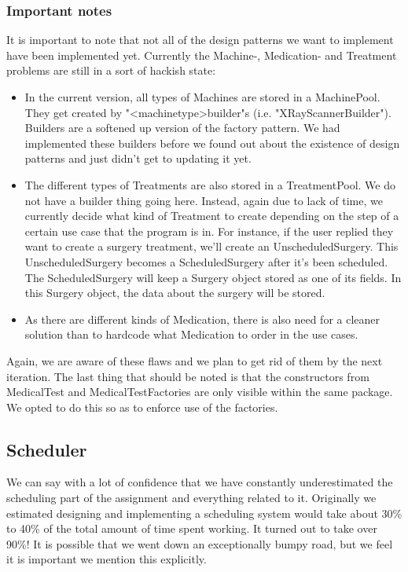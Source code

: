 \documentclass[11pt]{article}
\begin{document}
\subsubsection{Important notes}
It is important to note that not all of the design patterns we want to implement have been implemented yet. Currently the Machine-, Medication- and Treatment problems are still in a sort of hackish state:
\begin{itemize}
\item{In the current version, all types of Machines are stored in a MachinePool. They get created by "\textless machinetype\textgreater builder"s (i.e. "XRayScannerBuilder"). Builders are a softened up version of the factory pattern. We had implemented these builders before we found out about the existence of design patterns and just didn't get to updating it yet.}
\item{The different types of Treatments are also stored in a TreatmentPool. We do not have a builder thing going here. Instead, again due to lack of time, we currently decide what kind of Treatment to create depending on the step of a certain use case that the program is in. For instance, if the user replied they want to create a surgery treatment, we'll create an UnscheduledSurgery. This UnscheduledSurgery becomes a ScheduledSurgery after it's been scheduled. The ScheduledSurgery will keep a Surgery object stored as one of its fields. In this Surgery object, the data about the surgery will be stored.}
\item{As there are different kinds of Medication, there is also need for a cleaner solution than to hardcode what Medication to order in the use cases.}
\end{itemize}
Again, we are aware of these flaws and we plan to get rid of them by the next iteration.
\newline 
The last thing that should be noted is that the constructors from MedicalTest and MedicalTestFactories are only visible within the same package. We opted to do this so as to enforce use of the factories.

\subsection{Scheduler}
We can say with a lot of confidence that we have constantly underestimated the scheduling part of the assignment and everything related to it. Originally we estimated designing and implementing a scheduling system would take about 30\% to 40\% of the total amount of time spent working. It turned out to take over 90\%! It is possible that we went down an exceptionally bumpy road, but we feel it is important we mention this explicitly. 
\end{document}
